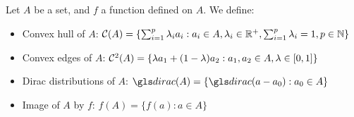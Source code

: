 \subsection{}

\label{sec:proof_pi_hull}

\begin{definition}
    Let $A$ be a set, and $f$ a function defined on $A$. We define:

    \begin{itemize}
        \item Convex hull of $A$: $\mathcal{C}(A) = \{\sum_{i=1}^p \lambda_i a_i: a_i\in A, \lambda_i\in\mathbb{R}^+, \sum_{i=1}^p \lambda_i = 1, p\in\mathbb{N}\}$
        \item Convex edges of $A$: $\mathcal{C}^2(A) = \{\lambda a_1 + (1-\lambda)a_2: a_1, a_2\in A, \lambda\in[0, 1]\}$
        \item Dirac distributions of $A$: $\dirac(A) = \{\dirac(a-a_0): a_0\in A\}$
        \item Image of $A$ by $f$: $f(A) = \{f(a): a\in A\}$
    \end{itemize}
\end{definition}

